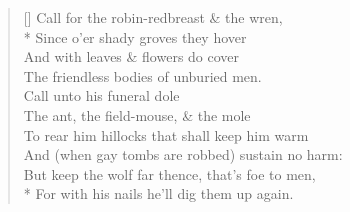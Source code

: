 \documentclass[MAIN]{subfiles}
\begin{document}
\settowidth{\versewidth}{Call for the robin-redbreast \& the wren}
\begin{verse}[\versewidth]
Call for the robin-redbreast \& the wren,\\*
Since o'er shady groves they hover\\
And with leaves \& flowers do cover\\
The friendless bodies of unburied men.\\
Call unto his funeral dole\\
The ant, the field-mouse, \& the mole\\
To rear him hillocks that shall keep him warm\\
And (when gay tombs are robbed) sustain no harm:\\
But keep the wolf far thence, that's foe to men,\\*
For with his nails he'll dig them up again.
\end{verse}
\end{document}
